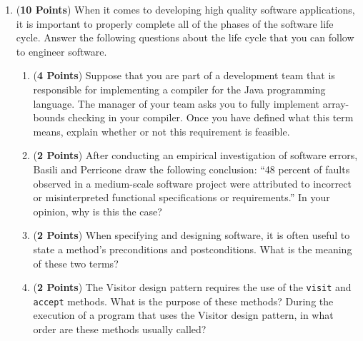 \documentclass[12pt,epsf,psfig,graphicx]{article}
\begin{document}
\begin{enumerate}
\begin{enumerate}
\end{enumerate}

\newpage

\item ({\bf 10 Points}) When it comes to developing high quality software applications, it is important to properly
	complete all of the phases of the software life cycle.  Answer the following questions about the life cycle that you
	can follow to engineer software.

\begin{enumerate}

\item ({\bf 4 Points}) Suppose that you are part of a development team that is responsible for implementing a compiler
	for the Java programming language.  The manager of your team asks you to fully implement array-bounds checking
	in your compiler.  Once you have defined what this term means, explain whether or not this requirement is feasible.

\item ({\bf 2 Points}) After conducting an empirical investigation of software errors, Basili and Perricone draw the
	following conclusion: ``48 percent of faults observed in a medium-scale software project were attributed to
	incorrect or misinterpreted functional specifications or requirements.''  In your opinion, why is this the case?

\item ({\bf 2 Points}) When specifying and designing software, it is often useful to state a method's preconditions
	and postconditions. What is the meaning of these two terms?

\item ({\bf 2 Points}) The Visitor design pattern requires the use of the {\tt visit} and {\tt accept} methods.  What is
	the purpose of these methods? During the execution of a program that uses the Visitor design pattern, in what order
	are these methods usually called?


\end{enumerate}
\end{enumerate}
\end{document}
